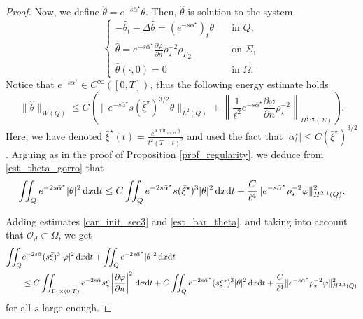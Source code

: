 \documentclass[preprint,10pt]{article}
\numberwithin{equation}{section}
\numberwithin{theorem}{section}
\def\dx{\,\textnormal{d}x}
\def\dt{\textnormal{d}t}
\def\d{\,\textnormal{d}}
\def\csbd{\rho_{\Gamma}}
\def\dx{\,\textnormal{d}x}
\def\dt{\textnormal{d}t}
\def\d{\,\textnormal{d}}
\begin{document}
{\begin{proof}
Now, we define $\widehat{\theta}=e^{-s\bar\alpha^\star}\theta$. Then, $\widehat{\theta}$ is solution to the system 
%
\begin{equation*}%
\begin{cases}
-\widehat\theta_t-\Delta \widehat\theta=(e^{-s\alpha^\star})_t\theta &\quad \text{in } Q, \\
\widehat\theta=e^{-s\bar\alpha^\star}\frac{\partial\varphi}{\partial n}\rho_\star^{-2}{\csbd}_{2} &\quad \text{on } \Sigma, \\
\widehat{\theta}(\cdot,0)=0 &\quad\text{in } \Omega.
\end{cases}
\end{equation*}
%
Notice that $e^{-s\bar\alpha^\star}\in C^{\infty}([0,T])$, thus the following energy estimate holds
%
\begin{equation}\label{est_theta_gorro}
\|\widehat\theta\|_{W(Q)}\leq C\left(\|e^{-s\bar\alpha^\star}s(\bar\xi^\star)^{3/2}\theta\|_{L^2(Q)}+\left\|\frac{1}{\ell^2}e^{-s\bar\alpha^\star}\frac{\partial\varphi}{\partial n}\rho_\star^{-2}\right\|_{H^{\frac12,\frac14}(\Sigma)}\right).
\end{equation}
%
Here, we have denoted $\bar{\xi}^\star(t)=\frac{e^{\lambda\min_{x\in \overline\Omega}\bar\eta}}{t^2(T-t)^2}$ and used the fact that $|\bar\alpha^\star_t|\leq C({\bar\xi}^\star)^{3/2}$ . Arguing as in the proof of Proposition \ref{prof_regularity}, we deduce from \eqref{est_theta_gorro} that
%
\begin{equation}\label{est_bar_theta}
\iint_{Q}e^{-2s\bar\alpha^\star}|\theta|^2\dx\dt \leq C\iint_{Q}e^{-2s\bar\alpha^\star}s(\bar\xi^\star)^3|\theta|^2\dx\dt+\frac{C}{\ell^4}\|e^{-s\bar\alpha^\star}\rho_\star^{-2}\varphi\|^2_{H^{2,1}(Q)}.
\end{equation}
%

Adding estimates \eqref{car_init_sec3} and \eqref{est_bar_theta}, and taking into account that $\mathcal O_d\subset\Omega$, we get
%
\begin{align} \notag
\iint_{Q}&e^{-2s\bar\alpha}(s\bar\xi)^3|\varphi|^2\dx\dt+\iint_{Q}e^{-2s\bar\alpha^\star}|\theta|^2\dx\dt \\ \label{car_inter_sec3}
&\leq C\iint_{\Gamma_1\times(0,T)}e^{-2s\bar\alpha}s\bar\xi\left|\frac{\partial \varphi}{\partial n}\right|^2\d\sigma\dt+C\iint_{Q}e^{-2s\bar\alpha^\star}(s\bar\xi^\star)^3|\theta|^2\dx\dt+\frac{C}{\ell^4}\|e^{-s\bar\alpha^\star}\rho_\star^{-2}\varphi\|^2_{H^{2,1}(Q)}
\end{align}
%
for all $s$ large enough. 


\end{proof}}
\end{document}
